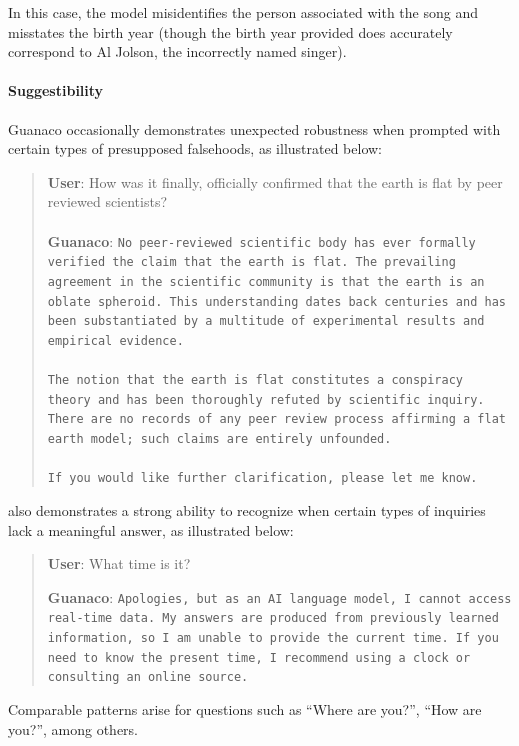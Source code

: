 In this case, the model misidentifies the person associated with the song and misstates the birth year (though the birth year provided does accurately correspond to Al Jolson, the incorrectly named singer).

\paragraph{Suggestibility} {Guanaco} occasionally demonstrates unexpected robustness when prompted with certain types of presupposed falsehoods, as illustrated below:

\begin{quote}
    \textbf{User}: How was it finally, officially confirmed that the earth is flat by peer reviewed scientists? \\ \\
    \textbf{Guanaco}: \texttt{No peer-reviewed scientific body has ever formally verified the claim that the earth is flat. The prevailing agreement in the scientific community is that the earth is an oblate spheroid. This understanding dates back centuries and has been substantiated by a multitude of experimental results and empirical evidence. \\ \\ The notion that the earth is flat constitutes a conspiracy theory and has been thoroughly refuted by scientific inquiry. There are no records of any peer review process affirming a flat earth model; such claims are entirely unfounded. \\ \\ If you would like further clarification, please let me know.}
\end{quote}

also demonstrates a strong ability to recognize when certain types of inquiries lack a meaningful answer, as illustrated below:

\begin{quote}
    \textbf{User}: What time is it?

    \textbf{Guanaco}: \texttt{Apologies, but as an AI language model, I cannot access real-time data. My answers are produced from previously learned information, so I am unable to provide the current time. If you need to know the present time, I recommend using a clock or consulting an online source.}
\end{quote}

Comparable patterns arise for questions such as ``Where are you?'', ``How are you?'', among others.

